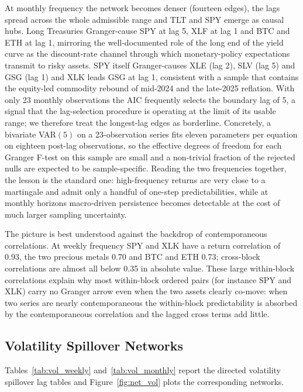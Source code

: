 \documentclass[12pt,a4paper]{article}
\newcommand{\probsub}[2]{\subsection{#2}}
\begin{document}
At monthly frequency the network becomes denser (fourteen edges), the lags spread across the whole admissible range and TLT and SPY emerge as causal hubs. Long Treasuries Granger-cause SPY at lag 5, XLF at lag 1 and BTC and ETH at lag 1, mirroring the well-documented role of the long end of the yield curve as the discount-rate channel through which monetary-policy expectations transmit to risky assets. SPY itself Granger-causes XLE (lag 2), SLV (lag 5) and GSG (lag 1) and XLK leads GSG at lag 1, consistent with a sample that contains the equity-led commodity rebound of mid-2024 and the late-2025 reflation. With only 23 monthly observations the AIC frequently selects the boundary lag of 5, a signal that the lag-selection procedure is operating at the limit of its usable range; we therefore treat the longest-lag edges as borderline. Concretely, a bivariate VAR$(5)$ on a 23-observation series fits eleven parameters per equation on eighteen post-lag observations, so the effective degrees of freedom for each Granger F-test on this sample are small and a non-trivial fraction of the rejected nulls are expected to be sample-specific. Reading the two frequencies together, the lesson is the standard one: high-frequency returns are very close to a martingale and admit only a handful of one-step predictabilities, while at monthly horizons macro-driven persistence becomes detectable at the cost of much larger sampling uncertainty.

The picture is best understood against the backdrop of contemporaneous correlations. At weekly frequency SPY and XLK have a return correlation of 0.93, the two precious metals 0.70 and BTC and ETH 0.73; cross-block correlations are almost all below 0.35 in absolute value. These large within-block correlations explain why most within-block ordered pairs (for instance SPY and XLK) carry no Granger arrow even when the two assets clearly co-move: when two series are nearly contemporaneous the within-block predictability is absorbed by the contemporaneous correlation and the lagged cross terms add little.

\probsub{1c}{Volatility Spillover Networks}

Tables~\ref{tab:vol_weekly} and~\ref{tab:vol_monthly} report the directed volatility spillover lag tables and Figure~\ref{fig:net_vol} plots the corresponding networks.



\end{document}
